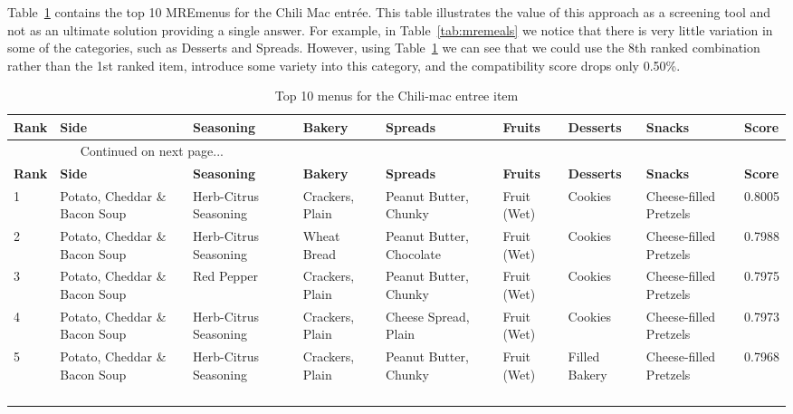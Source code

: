 Table~\ref{tab:mrechili} contains the top 10 MRE\tm menus for the Chili Mac entr\'{e}e.  This table illustrates the value of this approach as a screening tool and not as an ultimate solution providing a single answer.  For example, in Table~\ref{tab:mremeals} we notice that there is very little variation in some of the categories, such as Desserts and Spreads.  However, using Table~\ref{tab:mrechili} we can see that we could use the 8th ranked combination rather than the 1st ranked item, introduce some variety into this category, and the compatibility score drops only 0.50\%.  

\begin{landscape}
\footnotesize
\begin{longtable}{p{0.5cm}p{4cm}p{4cm}p{2cm}p{2.3cm}p{0.8cm}p{1.5cm}p{2.2cm}p{0.8cm}}
\caption{Top 10 menus for the Chili-mac entree item } \\
\label{tab:mrechili}
\endfirsthead
\midrule
{\bf Rank} & {\bf Side} & {\bf Seasoning} & {\bf Bakery} & {\bf Spreads} & {\bf Fruits} & {\bf Desserts} & {\bf Snacks} & {\bf Score}\\
\hline
\endhead
\multicolumn{3}{c}{Continued on next page...} \\
\endfoot
\bottomrule
\endlastfoot
\toprule
{\bf Rank} & {\bf Side} & {\bf Seasoning} & {\bf Bakery} & {\bf Spreads} & {\bf Fruits} & {\bf Desserts} & {\bf Snacks} & {\bf Score}\\
\midrule
1 & Potato, Cheddar \& Bacon Soup & Herb-Citrus Seasoning & Crackers, Plain & Peanut Butter, Chunky & Fruit (Wet) & Cookies & Cheese-filled Pretzels & 0.8005\\
\midrule
2 & Potato, Cheddar \& Bacon Soup & Herb-Citrus Seasoning & Wheat Bread & Peanut Butter, Chocolate & Fruit (Wet) & Cookies & Cheese-filled Pretzels & 0.7988\\
\midrule
3 & Potato, Cheddar \& Bacon Soup & Red Pepper & Crackers, Plain & Peanut Butter, Chunky & Fruit (Wet) & Cookies & Cheese-filled Pretzels & 0.7975\\
\midrule
4 & Potato, Cheddar \& Bacon Soup & Herb-Citrus Seasoning & Crackers, Plain & Cheese Spread, Plain & Fruit (Wet) & Cookies & Cheese-filled Pretzels & 0.7973\\
\midrule
5 & Potato, Cheddar \& Bacon Soup & Herb-Citrus Seasoning & Crackers, Plain & Peanut Butter, Chunky & Fruit (Wet) & Filled Bakery & Cheese-filled Pretzels & 0.7968\\
\midrule
\\
\\
\\
\\


\end{longtable}
\end{landscape}
